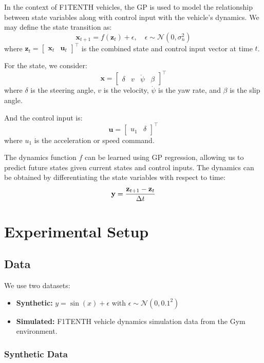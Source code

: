 \documentclass[12pt]{article}
\begin{document}
In the context of F1TENTH vehicles, the GP is used to model the relationship between state variables along with control input with the vehicle's dynamics. We may define the state transition as:
\[
    \mathbf{x}_{t+1} = f(\mathbf{z}_t) + \epsilon, \quad \epsilon \sim \mathcal{N}(0, \sigma_n^2)
\]
where $\mathbf{z}_t = \begin{bmatrix}\mathbf{x}_t & \mathbf{u}_t \end{bmatrix}^\top$ is the combined state and control input vector at time $t$.

For the state, we consider:
\[
    \mathbf{x} = \begin{bmatrix}
    \delta & v & \dot{\psi} & \beta
    \end{bmatrix}^\top
\]
where $\delta$ is the steering angle, $v$ is the velocity, $\dot{\psi}$ is the yaw rate, and $\beta$ is the slip angle.

And the control input is:
\[
    \mathbf{u} = \begin{bmatrix}
    u_1 & \delta
    \end{bmatrix}^\top
\]
where $u_1$ is the acceleration or speed command.

The dynamics function $f$ can be learned using GP regression, allowing us to predict future states given current states and control inputs. The dynamics can be obtained by differentiating the state variables with respect to time:
\[
    \mathbf{y} = {\mathbf{z}_{t+1} - \mathbf{z}_t \over \Delta t}
\]


\section{Experimental Setup}
\subsection{Data}
We use two datasets:
\begin{itemize}
    \item \textbf{Synthetic:} $y = \sin(x) + \epsilon$ with $\epsilon \sim \mathcal{N}(0, 0.1^2)$
    \item \textbf{Simulated:} F1TENTH vehicle dynamics simulation data from the Gym environment.
\end{itemize}

\subsubsection{Synthetic Data}
\end{document}
